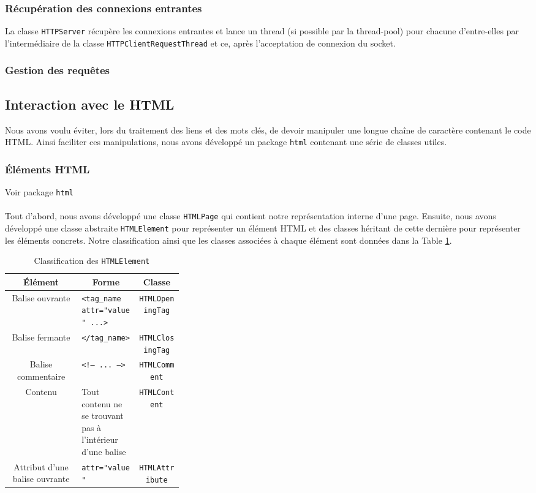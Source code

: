 \documentclass[a4paper,11pt]{article}
\newcommand{\ttseek}[1]{Voir package \texttt{#1}\paragraph{}}
\begin{document}
	\subsubsection{Récupération des connexions entrantes}
La classe \texttt{HTTPServer} récupère les connexions entrantes et lance un thread (si possible par la thread-pool) pour chacune d'entre-elles par l'intermédiaire de la classe \texttt{HTTPClientRequestThread} et ce, après l'acceptation de connexion du socket.

	\subsubsection{Gestion des requêtes}

\subsection{Interaction avec le HTML}
Nous avons voulu éviter, lors du traitement des liens et des mots clés, de devoir manipuler une longue chaîne de caractère contenant le code HTML. Ainsi faciliter ces manipulations, nous avons développé un package \texttt{html} contenant une série de classes utiles. 
\subsubsection{Éléments HTML}
\ttseek{html}
Tout d'abord, nous avons développé une classe \texttt{HTMLPage} qui contient notre représentation interne d'une page.
Ensuite, nous avons développé une classe abstraite \texttt{HTMLElement} pour représenter un élément HTML et des classes héritant de cette dernière pour représenter les éléments concrets. Notre classification ainsi que les classes associées à chaque élément sont données dans la Table \ref{tab:htmlelement}.
\begin{table}[h]
	\center
	\begin{tabular}{|c|p{0.33\linewidth}|c|}
		\hline
		\textbf{Élément} & \multicolumn{1}{c|}{\textbf{Forme}} & \textbf{Classe}\\
		\hline
		Balise ouvrante & \texttt{<tag\_name attr="value" ...>} & \texttt{HTMLOpeningTag}\\
		\hline
		Balise fermante & \texttt{</tag\_name>} & \texttt{HTMLClosingTag}\\
		\hline
		Balise commentaire & \texttt{<!-- ... -->} & \texttt{HTMLComment} \\
		\hline
		Contenu & Tout contenu ne se trouvant pas à l'intérieur d'une balise & \texttt{HTMLContent}\\
		\hline
		Attribut d'une balise ouvrante & \texttt{attr="value"} & \texttt{HTMLAttribute}\\
		\hline
	\end{tabular}
	\caption{Classification des \texttt{HTMLElement}}
	\label{tab:htmlelement}
\end{table}
\end{document}
